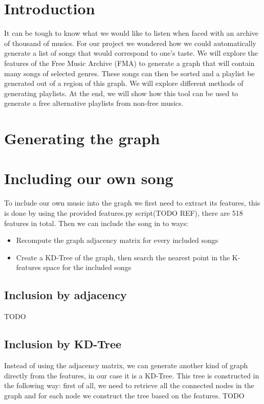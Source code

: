 \section{Introduction}
It can be tough to know what we would like to listen when faced with an archive of thousand of musics. For our project we wondered how we could automatically generate a list of songs that would correspond to one's taste. We will explore the features of the Free Music Archive (FMA) to generate a graph that will contain many songs of selected genres. These songs can then be sorted and a playlist be generated out of a region of this graph. We will explore different methods of generating playlists. At the end, 
we will show how this tool can be used to generate a free alternative playlists from non-free musics.

\section{Generating the graph}


\section{Including our own song}

To include our own music into the graph we first need to extract its features, this is done by using
the provided features.py script(TODO REF), there are 518 features in total.
Then we can include the song in to ways:
\begin{itemize}
\item Recompute the graph adjacency matrix for every included songs
\item Create a KD-Tree of the graph, then search the nearest point in the K-features space for the included songs
\end{itemize}

\subsection{Inclusion by adjacency}
TODO

\subsection{Inclusion by KD-Tree}
Instead of using the adjacency matrix, we can generate another kind of graph directly from the
features, in our case it is a KD-Tree.
This tree is constructed in the following way: first of all, we need to retrieve all the connected nodes in the graph and for each node we construct the tree based on the features.
TODO

